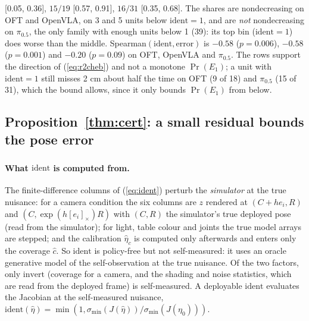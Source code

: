 \documentclass{article}
\newcommand{\ident}{\mathrm{ident}}
\newcommand{\invert}{\mathrm{invert}}
\newcommand{\pihalf}{$\pi_{0.5}$}
\newcommand{\ph}{\textsuperscript{\dag}}
\begin{document}
[0.05, 0.36], $15/19$ [0.57, 0.91], $16/31$ [0.35, 0.68]. The shares are nondecreasing on OFT and OpenVLA, on 3 and 5
units below $\ident = 1$, and are \emph{not} nondecreasing on \pihalf, the only family with enough units below 1 (39):
its top bin ($\ident = 1$) does worse than the middle. Spearman$(\ident, \text{error})$ is $-0.58$ ($p = 0.006$),
$-0.58$ ($p = 0.001$) and $-0.20$ ($p = 0.09$) on OFT, OpenVLA and \pihalf. The rows support the direction of
(\ref{eq:r2cheb}) and not a monotone $\Pr(E_1)$; a unit with $\ident = 1$ still misses 2 cm about half the time on OFT
(9 of 18) and \pihalf{} (15 of 31), which the bound allows, since it only bounds $\Pr(E_1)$ from below.

\subsection{Proposition~\ref{thm:cert}: a small residual bounds the pose error}
\label{app:cert}

\paragraph{What $\ident$ is computed from\ph.}
The finite-difference columns of (\ref{eq:ident}) perturb the \emph{simulator} at the true nuisance: for a camera
condition the six columns are $z$ rendered at $(C + h e_i, R)$ and $(C, \exp(h[e_i]_\times)R)$ with $(C, R)$ the
simulator's true deployed pose (read from the simulator); for light, table colour
and joints the true model arrays are stepped; and the calibration $\hat\eta_c$ is computed only afterwards and enters
only the coverage $\hat c$. So $\ident$ is policy-free but not self-measured: it uses an oracle generative model of the
self-observation at the true nuisance. Of the two factors, only $\invert$ (coverage for a camera, and the shading and
noise statistics, which are read from the deployed frame) is self-measured. A deployable $\ident$ evaluates the
Jacobian at the self-measured nuisance, $\ident(\hat\eta) = \min(1, \sigma_{\min}(J(\hat\eta))/\sigma_{\min}(J(\eta_0)))$.
\end{document}
